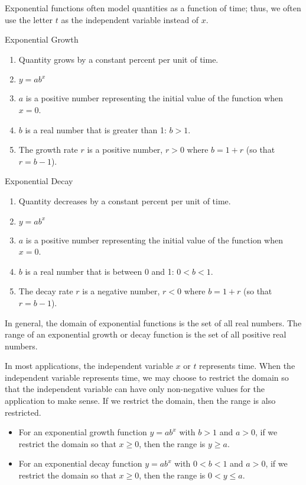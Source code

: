 Exponential functions often model quantities as a function of time; thus, we often use the letter \( t \) as the independent variable instead of \( x \).

\begin{summarybox}{Exponential Growth}
    \begin{enumerate}
        \item Quantity grows by a constant percent per unit of time.
        \item \( y = ab^x \)
        \item \( a \) is a positive number representing the initial value of the function when \( x = 0 \).
        \item \( b \) is a real number that is greater than 1: \( b > 1 \).
        \item The growth rate \( r \) is a positive number, \( r > 0 \) where \( b = 1 + r \) (so that \( r = b - 1 \)).
    \end{enumerate}
\end{summarybox}
\begin{summarybox}{Exponential Decay}
    \begin{enumerate}
        \item Quantity decreases by a constant percent per unit of time.
        \item \( y = ab^x \)
        \item \( a \) is a positive number representing the initial value of the function when \( x = 0 \).
        \item \( b \) is a real number that is between 0 and 1: \( 0 < b < 1 \).
        \item The decay rate \( r \) is a negative number, \( r < 0 \) where \( b = 1 + r \) (so that \( r = b - 1 \)).
    \end{enumerate}
\end{summarybox}

In general, the domain of exponential functions is the set of all real numbers. The range of an exponential growth or decay function is the set of all positive real numbers.

In most applications, the independent variable \( x \) or \( t \) represents time. When the independent variable represents time, we may choose to restrict the domain so that the independent variable can have only non-negative values for the application to make sense. If we restrict the domain, then the range is also restricted.
\begin{itemize}
    \item For an exponential growth function \( y = ab^x \) with \( b > 1 \) and \( a > 0 \), if we restrict the domain so that \( x \geq 0 \), then the range is \( y \geq a \).
    \item For an exponential decay function \( y = ab^x \) with \( 0 < b < 1 \) and \( a > 0 \), if we restrict the domain so that \( x \geq 0 \), then the range is \( 0 < y \leq a \).
\end{itemize}

